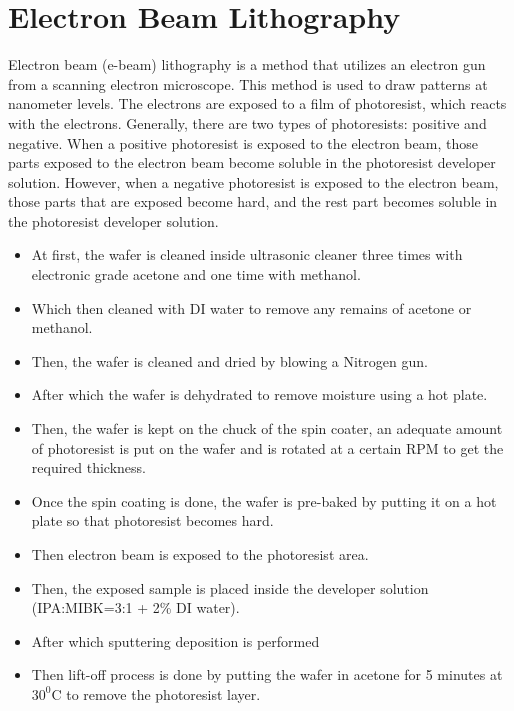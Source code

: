 \documentclass[12pt,a4paper,bold]{thesis}
\theoremstyle{thm}
\theoremstyle{definition}
\begin{document}
\section{Electron Beam Lithography}
\indent \indent\indent Electron beam (e-beam) lithography is a method that utilizes an electron gun from a scanning electron microscope. This method is used to draw patterns at nanometer levels. The electrons are exposed to a film of photoresist, which reacts with the electrons. Generally, there are two types of photoresists: positive and negative. When a positive photoresist is exposed to the electron beam, those parts exposed to the electron beam become soluble in the photoresist developer solution. However, when a negative photoresist is exposed to the electron beam, those parts that are exposed become hard, and the rest part becomes soluble in the photoresist developer solution.
\begin{itemize}
	\item At first, the wafer is cleaned inside ultrasonic cleaner three times with electronic grade acetone and one time with methanol.
	\item Which then cleaned with DI water to remove any remains of acetone or methanol.
	\item Then, the wafer is cleaned and dried by blowing a Nitrogen gun.
	\item After which the wafer is dehydrated to remove moisture using a hot plate.
	\item Then, the wafer is kept on the chuck of the spin coater, an adequate amount of photoresist is put on the wafer and is rotated at a certain RPM to get the required thickness.
	\item Once the spin coating is done, the wafer is pre-baked by putting it on a hot plate so that photoresist becomes hard.
	\item Then electron beam is exposed to the photoresist area.
	\item Then, the exposed sample is placed inside the developer solution (IPA:MIBK=3:1 + 2\% DI water).
	\item After which sputtering deposition is performed
	\item Then lift-off process is done by putting the wafer in acetone for 5 minutes at $30^0$C to remove the photoresist layer.
	
\end{itemize} 
   
\end{document}
